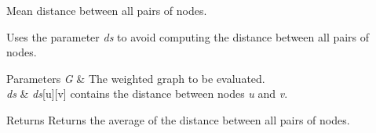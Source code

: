 Mean distance between all pairs of nodes. 

Uses the parameter {\itshape ds} to avoid computing the distance between all pairs of nodes.


\begin{DoxyParams}{Parameters}
{\em G} & The weighted graph to be evaluated. \\
\hline
{\em ds} & {\itshape ds}\mbox{[}u\mbox{]}\mbox{[}v\mbox{]} contains the distance between nodes {\itshape u} and {\itshape v}. \\
\hline
\end{DoxyParams}
\begin{DoxyReturn}{Returns}
Returns the average of the distance between all pairs of nodes. 
\end{DoxyReturn}

